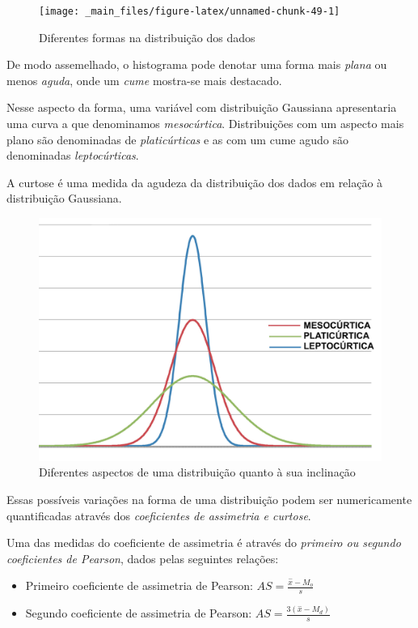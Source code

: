 \documentclass[
]{book}
\providecommand{\tightlist}{%
  \setlength{\itemsep}{0pt}\setlength{\parskip}{0pt}}
\begin{document}
\begin{figure}

{\centering \texttt{[image: \_main\_files/figure-latex/unnamed-chunk-49-1]} 

}

\caption{Diferentes formas na distribuição dos dados}\label{fig:unnamed-chunk-49}
\end{figure}

De modo assemelhado, o histograma pode denotar uma forma mais \emph{plana} ou menos \emph{aguda}, onde um \emph{cume} mostra-se mais destacado.

Nesse aspecto da forma, uma variável com distribuição Gaussiana apresentaria uma curva a que denominamos \emph{mesocúrtica}. Distribuições com um aspecto mais plano são denominadas de \emph{platicúrticas} e as com um cume agudo são denominadas \emph{leptocúrticas}.

A curtose é uma medida da agudeza da distribuição dos dados em relação à distribuição Gaussiana.

\begin{figure}

{\centering \includegraphics[width=0.5\linewidth]{images3/curtose} 

}

\caption{Diferentes aspectos de uma distribuição quanto à sua inclinação}\label{fig:unnamed-chunk-50}
\end{figure}

Essas possíveis variações na forma de uma distribuição podem ser numericamente quantificadas através dos \emph{coeficientes de assimetria e curtose}.

Uma das medidas do coeficiente de assimetria é através do \emph{primeiro ou segundo coeficientes de Pearson}, dados pelas seguintes relações:

\begin{itemize}
\tightlist
\item
  Primeiro coeficiente de assimetria de Pearson: \(AS= \frac{ \stackrel{-}{x} - M_{o} }{ s }\)
\item
  Segundo coeficiente de assimetria de Pearson: \(AS = \frac{ 3 ( \stackrel{-}{x} - M_{d}) } { s }\)
\end{itemize}
\end{document}
